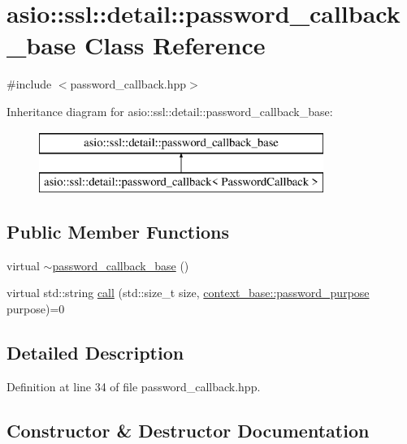 \hypertarget{classasio_1_1ssl_1_1detail_1_1password__callback__base}{}\section{asio\+:\+:ssl\+:\+:detail\+:\+:password\+\_\+callback\+\_\+base Class Reference}
\label{classasio_1_1ssl_1_1detail_1_1password__callback__base}


{\ttfamily \#include $<$password\+\_\+callback.\+hpp$>$}

Inheritance diagram for asio\+:\+:ssl\+:\+:detail\+:\+:password\+\_\+callback\+\_\+base\+:\begin{figure}[H]
\begin{center}
\leavevmode
\includegraphics[height=2.000000cm]{classasio_1_1ssl_1_1detail_1_1password__callback__base}
\end{center}
\end{figure}
\subsection*{Public Member Functions}
\begin{DoxyCompactItemize}
\item 
virtual \hyperlink{classasio_1_1ssl_1_1detail_1_1password__callback__base_afa48903d65b20b6a1b5a6349dfad9b62}{$\sim$password\+\_\+callback\+\_\+base} ()
\item 
virtual std\+::string \hyperlink{classasio_1_1ssl_1_1detail_1_1password__callback__base_a0921e1cba762d2b75cd198ed2bac110a}{call} (std\+::size\+\_\+t size, \hyperlink{classasio_1_1ssl_1_1context__base_a0e5aec1cd0f3db28becde1dca686c855}{context\+\_\+base\+::password\+\_\+purpose} purpose)=0
\end{DoxyCompactItemize}


\subsection{Detailed Description}


Definition at line 34 of file password\+\_\+callback.\+hpp.



\subsection{Constructor \& Destructor Documentation}
\hypertarget{classasio_1_1ssl_1_1detail_1_1password__callback__base_afa48903d65b20b6a1b5a6349dfad9b62}{}
